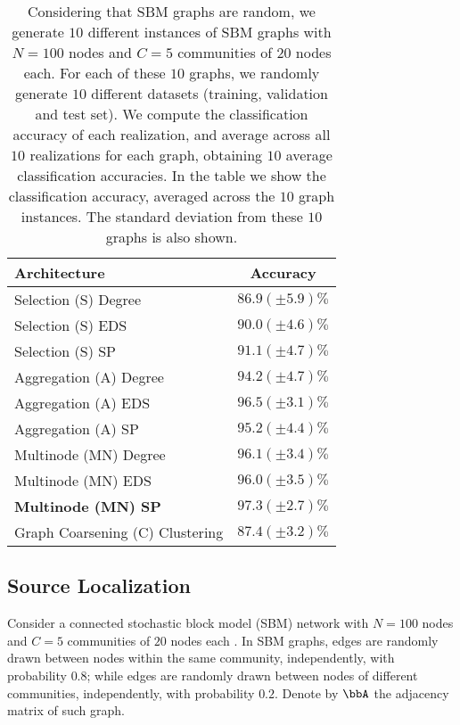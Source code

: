 \begin{table}
	\centering
\begin{tabular}{lc} \hline
Architecture 				& Accuracy 				\\ \hline
Selection (S) Degree		& $86.9 (\pm 5.9) \%$	\\
Selection (S) EDS			& $90.0 (\pm 4.6) \%$	\\
Selection (S) SP			& $91.1 (\pm 4.7) \%$	\\
Aggregation	(A)	Degree		& $94.2 (\pm 4.7) \%$	\\
Aggregation	(A)	EDS			& $96.5 (\pm 3.1) \%$	\\
Aggregation	(A)	SP			& $95.2 (\pm 4.4) \%$	\\
Multinode (MN) Degree		& $96.1 (\pm 3.4) \%$	\\
Multinode (MN) EDS			& $96.0 (\pm 3.5) \%$	\\
\textbf{Multinode (MN) SP}			& $\mathbf{97.3 (\pm 2.7) \%}$	\\
Graph Coarsening (C) Clustering		& $87.4 (\pm 3.2)\%$ \\ \hline
\end{tabular}
	\caption{Considering that SBM graphs are random, we generate $10$ different instances of SBM graphs with $N=100$ nodes and $C=5$ communities of $20$ nodes each. For each of these $10$ graphs, we randomly generate $10$ different datasets (training, validation and test set). We compute the classification accuracy of each realization, and average across all $10$ realizations for each graph, obtaining $10$ average classification accuracies. In the table we show the classification accuracy, averaged across the $10$ graph instances. The standard deviation from these $10$ graphs is also shown.}
	\label{table_sourceloc}
\end{table}


\subsection{Source Localization} \label{subsec_sourceloc}

Consider a connected stochastic block model (SBM) network with $N=100$ nodes and $C=5$ communities of $20$ nodes each \cite{decelle11-sbm}. In SBM graphs, edges are randomly drawn between nodes within the same community, independently, with probability $0.8$; while edges are randomly drawn between nodes of different communities, independently, with probability $0.2$. Denote by $\bbA$ the adjacency matrix of such graph.

